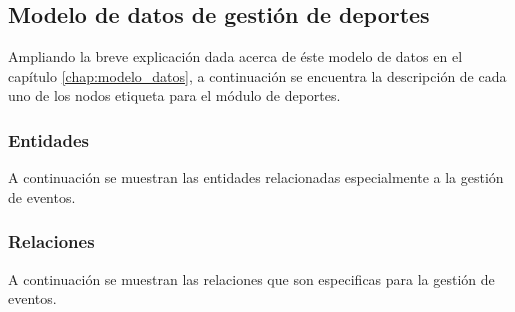 \clearpage


\subsection{Modelo de datos de gestión de deportes}
Ampliando la breve explicación dada acerca de éste modelo de datos en el capítulo \ref{chap:modelo_datos}, a continuación se encuentra la descripción de cada uno de los nodos etiqueta para el módulo de deportes.

\subsubsection{Entidades}
A continuación se muestran las entidades relacionadas especialmente a la gestión de eventos.

\clearpage


\subsubsection{Relaciones}
A continuación se muestran las relaciones que son especificas para la gestión de eventos.

\clearpage
